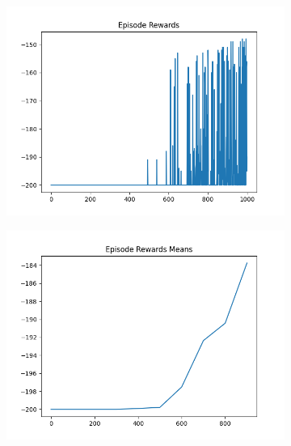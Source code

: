 \begin{figure}[H]
    \centering
    \begin{subfigure}{.47\linewidth}
        \centering
        \includegraphics[width=\textwidth]{mountain/2024-06-15_11-57-24_dqn_mountaincar_episode_rewards.png}
    \end{subfigure}
    \begin{subfigure}{.47\linewidth}
        \centering
        \includegraphics[width=\textwidth]{mountain/2024-06-15_11-57-24_dqn_mountaincar_episode_rewards_means.png}
    \end{subfigure}
    \begin{subfigure}{.47\linewidth}
        \centering

\end{subfigure}
\end{figure}
